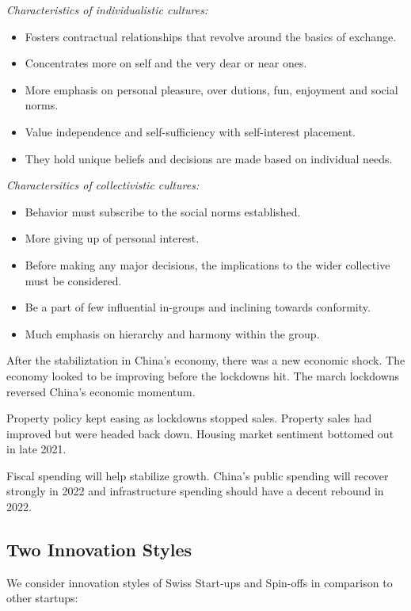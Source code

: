 \documentclass[a4paper]{extarticle}
\begin{document}
\textit{Characteristics of individualistic cultures:}

\begin{itemize}
    \item Fosters contractual relationships that revolve around the basics of exchange.
    \item Concentrates more on self and the very dear or near ones.
    \item More emphasis on personal pleasure, over dutions, fun, enjoyment and social norms.
    \item Value independence and self-sufficiency with self-interest placement.
    \item They hold unique beliefs and decisions are made based on individual needs.
\end{itemize}

\textit{Charactersitics of collectivistic cultures:}

\begin{itemize}
    \item Behavior must subscribe to the social norms established.
    \item More giving up of personal interest.
    \item Before making any major decisions, the implications to the wider collective must be considered.
    \item Be a part of few influential in-groups and inclining towards conformity.
    \item Much emphasis on hierarchy and harmony within the group.
\end{itemize}

After the stabiliztation in China's economy, there was a new economic shock. The economy looked to be improving before the lockdowns hit. The march lockdowns reversed China's economic momentum.

Property policy kept easing as lockdowns stopped sales. Property sales had improved but were headed back down. Housing market sentiment bottomed out in late 2021.

Fiscal spending will help stabilize growth. China's public spending will recover strongly in 2022 and infrastructure spending should have a decent rebound in 2022.

\subsection{Two Innovation Styles}

We consider innovation styles of Swiss Start-ups and Spin-offs in comparison to other startups:
\end{document}
